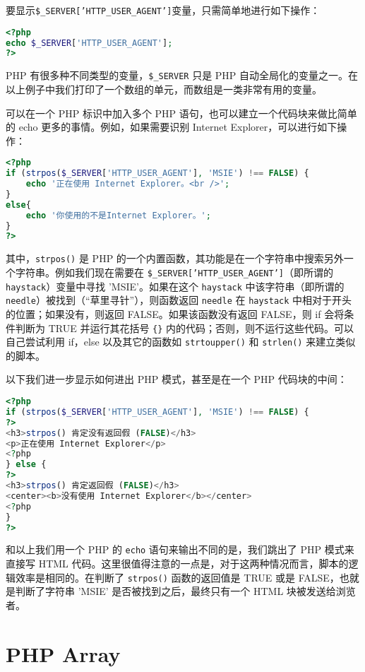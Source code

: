 要显示\texttt{\$\_SERVER['HTTP\_USER\_AGENT']}变量，只需简单地进行如下操作：

\begin{lstlisting}[language=PHP]
<?php 
echo $_SERVER['HTTP_USER_AGENT']; 
?>
\end{lstlisting}

PHP 有很多种不同类型的变量，\texttt{\$\_SERVER} 只是 PHP 自动全局化的变量之一。在以上例子中我们打印了一个数组的单元，而数组是一类非常有用的变量。

可以在一个 PHP 标识中加入多个 PHP 语句，也可以建立一个代码块来做比简单的 echo 更多的事情。例如，如果需要识别 Internet Explorer，可以进行如下操作：


\begin{lstlisting}[language=PHP]
<?php
if (strpos($_SERVER['HTTP_USER_AGENT'], 'MSIE') !== FALSE) {
    echo '正在使用 Internet Explorer。<br />';
}
else{
    echo '你使用的不是Internet Explorer。';
}
?>
\end{lstlisting}

其中，\texttt{strpos()} 是 PHP 的一个内置函数，其功能是在一个字符串中搜索另外一个字符串。例如我们现在需要在 \texttt{\$\_SERVER['HTTP\_USER\_AGENT']}（即所谓的 \texttt{haystack}）变量中寻找 'MSIE'。如果在这个 \texttt{haystack} 中该字符串（即所谓的 \texttt{needle}）被找到（“草里寻针”），则函数返回 \texttt{needle} 在 \texttt{haystack} 中相对于开头的位置；如果没有，则返回 FALSE。如果该函数没有返回 FALSE，则 if 会将条件判断为 TRUE 并运行其花括号 \texttt{\{\}} 内的代码；否则，则不运行这些代码。可以自己尝试利用 if，else 以及其它的函数如 \texttt{strtoupper()} 和 \texttt{strlen()} 来建立类似的脚本。


以下我们进一步显示如何进出 PHP 模式，甚至是在一个 PHP 代码块的中间：


\begin{lstlisting}[language=PHP]
<?php
if (strpos($_SERVER['HTTP_USER_AGENT'], 'MSIE') !== FALSE) {
?>
<h3>strpos() 肯定没有返回假 (FALSE)</h3>
<p>正在使用 Internet Explorer</p>
<?php
} else {
?>
<h3>strpos() 肯定返回假 (FALSE)</h3>
<center><b>没有使用 Internet Explorer</b></center>
<?php
}
?>
\end{lstlisting}

和以上我们用一个 PHP 的 \texttt{echo} 语句来输出不同的是，我们跳出了 PHP 模式来直接写 HTML 代码。这里很值得注意的一点是，对于这两种情况而言，脚本的逻辑效率是相同的。在判断了 \texttt{strpos()} 函数的返回值是 TRUE 或是 FALSE，也就是判断了字符串 'MSIE' 是否被找到之后，最终只有一个 HTML 块被发送给浏览者。


\chapter{PHP Array}





